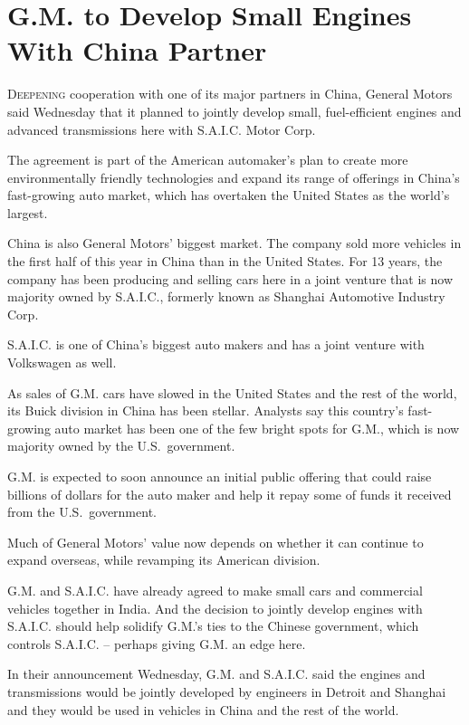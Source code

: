 ﻿\documentclass[12pt]{article}
\begin{document}
\section{G.M. to Develop Small Engines With China Partner}

\lettrine{D}{eepening} cooperation with one of its major partners in China,
General Motors said Wednesday that it planned to jointly develop small, fuel-efficient engines and
advanced transmissions here with S.A.I.C. Motor Corp.

The agreement is part of the American automaker's plan to create more environmentally friendly
technologies and expand its range of offerings in China's fast-growing auto market, which has
overtaken the United States as the world's largest.

China is also General Motors' biggest market. The company sold more vehicles in the first half of
this year in China than in the United States. For 13 years, the company has been producing and
selling cars here in a joint venture that is now majority owned by S.A.I.C., formerly known as
Shanghai Automotive Industry Corp.

S.A.I.C. is one of China's biggest auto makers and has a joint venture with Volkswagen as well.

As sales of G.M. cars have slowed in the United States and the rest of the world, its Buick division
in China has been stellar. Analysts say this country's fast-growing auto market has been one of the
few bright spots for G.M., which is now majority owned by the U.S.~government.

G.M. is expected to soon announce an initial public offering that could raise billions of dollars
for the auto maker and help it repay some of funds it received from the U.S.~government.

Much of General Motors' value now depends on whether it can continue to expand overseas, while
revamping its American division.

G.M. and S.A.I.C. have already agreed to make small cars and commercial vehicles together in India.
And the decision to jointly develop engines with S.A.I.C. should help solidify G.M.'s ties to the
Chinese government, which controls S.A.I.C. -- perhaps giving G.M. an edge here.

In their announcement Wednesday, G.M. and S.A.I.C. said the engines and transmissions would be
jointly developed by engineers in Detroit and Shanghai and they would be used in vehicles in China
and the rest of the world.
\end{document}
